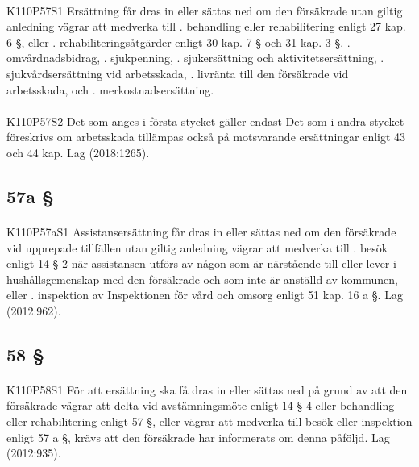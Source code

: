 \documentclass[a4paper,notitlepage,openany,10pt]{book}
\begin{document}
\paragraph*{}
{\tiny K110P57S1}
Ersättning får dras in eller sättas ned om den försäkrade utan giltig anledning vägrar att medverka till
. behandling eller rehabilitering enligt 27 kap. 6 §, eller
. rehabiliteringsåtgärder enligt 30 kap. 7 § och 31 kap. 3 §.
. omvårdnadsbidrag,
. sjukpenning,
. sjukersättning och aktivitetsersättning,
. sjukvårdsersättning vid arbetsskada,
. livränta till den försäkrade vid arbetsskada, och
. merkostnadsersättning.
\paragraph*{}
{\tiny K110P57S2}
Det som anges i första stycket gäller endast
Det som i andra stycket föreskrivs om arbetsskada tillämpas också på motsvarande ersättningar enligt 43 och 44 kap.
Lag (2018:1265).
\subsection*{57a §}
\paragraph*{}
{\tiny K110P57aS1}
Assistansersättning får dras in eller sättas ned om den försäkrade vid upprepade tillfällen utan giltig anledning vägrar att medverka till
. besök enligt 14 § 2 när assistansen utförs av någon som är närstående till eller lever i hushållsgemenskap med den försäkrade och som inte är anställd av kommunen, eller
. inspektion av Inspektionen för vård och omsorg enligt 51 kap. 16 a §.
Lag (2012:962).
\subsection*{58 §}
\paragraph*{}
{\tiny K110P58S1}
För att ersättning ska få dras in eller sättas ned på grund av att den försäkrade vägrar att delta vid avstämningsmöte enligt 14 § 4 eller behandling eller rehabilitering enligt 57 §, eller vägrar att medverka till besök eller inspektion enligt 57 a §, krävs att den försäkrade har informerats om denna påföljd.
Lag (2012:935).
\end{document}
